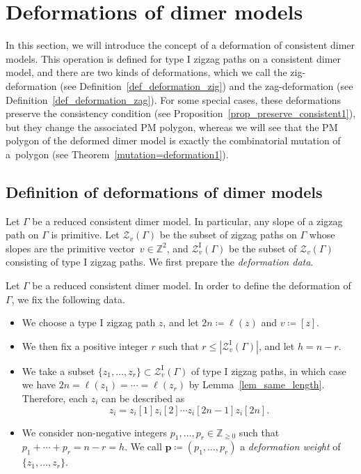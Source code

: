 \documentclass[pdftex]{sigma}%
\numberwithin{equation}{section}
\numberwithin{figure}{section}
\numberwithin{table}{section}
\newcommand{\ZZ}{\mathbb{Z}}
\newcommand{\rmI}{\mathrm{I}}
\newcommand{\calZ}{\mathcal{Z}}
\newcommand{\bfp}{\mathbf{p}}
\begin{document}
\section{Deformations of dimer models}\label{sec_def_deform}

In this section, we will introduce the concept of a deformation of consistent dimer models.
This operation is defined for type I zigzag paths on a consistent dimer model, and there are two kinds of deformations,
which we call the zig-deformation (see Definition~\ref{def_deformation_zig}) and the zag-deformation (see Definition~\ref{def_deformation_zag}).
For some special cases, these deformations preserve the consistency condition (see Proposition~\ref{prop_preserve_consistent1}),
but they change the associated PM polygon, whereas we will see that the PM polygon of the deformed dimer model is exactly the combinatorial mutation of a~polygon (see Theorem~\ref{mutation=deformation1}).

\subsection{Definition of deformations of dimer models}\label{subsec_def_deform}

Let $\Gamma$ be a reduced consistent dimer model.
In particular, any slope of a zigzag path on $\Gamma$ is primitive.
Let $\calZ_v(\Gamma)$ be the subset of zigzag paths on $\Gamma$ whose slopes are the primitive vector~$v\in\ZZ^2$,
and $\calZ_v^\rmI(\Gamma)$ be the subset of $\calZ_v(\Gamma)$ consisting of type I zigzag paths.
We first prepare the \emph{deformation data}.

\begin{Definition}\label{def_deformation_data}
Let $\Gamma$ be a reduced consistent dimer model. In order to define the deformation of $\Gamma$, we fix the following data.
\begin{itemize}\itemsep=0pt
\item[(1)] We choose a type I zigzag path $z$, and let $2n\coloneqq\ell(z)$ and $v\coloneqq [z]$.
\item[(2)] We then fix a positive integer $r$ such that $r\le |\calZ_v^\rmI(\Gamma)|$, and let $h=n-r$.
\item[(3)] We take a subset $\{z_1,\dots,z_r\}\subset\calZ_v^\rmI(\Gamma)$ of type I zigzag paths, in which case we have $2n=\ell(z_1)=\cdots=\ell(z_r)$ by Lemma~\ref{lem_same_length}.
Therefore, each $z_i$ can be described as
\begin{displaymath} z_i=z_i[1]z_i[2]\cdots z_i[2n-1]z_i[2n]. \end{displaymath}
\item[(4)]
We consider non-negative integers $p_1,\dots,p_r\in\ZZ_{\ge0}$ such that $p_1+\cdots+p_r=n-r=h$.
We call $\bfp\coloneqq(p_1,\dots,p_r)$ a \emph{deformation weight} of $\{z_1, \dots, z_r\}$.
\end{itemize}
\end{Definition}
\end{document}
